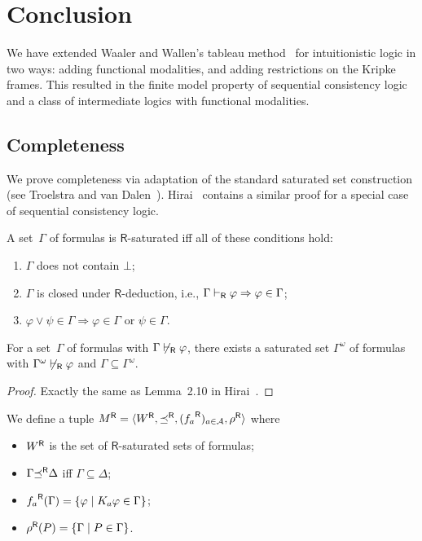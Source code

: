 \section{Conclusion}

We have extended Waaler and Wallen's tableau method~\cite{waaler1999tableaux} for intuitionistic
logic in two ways: adding functional modalities, and adding restrictions on the Kripke frames.
This resulted in the finite model property of sequential consistency
logic~\cite{hirailpar} and a class of intermediate logics with
functional modalities.

\subsection{Completeness}
We prove completeness via
  adaptation of the standard saturated set construction (see Troelstra
  and van Dalen~\cite[Ch.~2]{troelstra1988constructivism}).
  Hirai~\cite{hirailpar} contains a similar proof for a special case of
  sequential consistency logic.

\begin{definition}
 A set~$\Gamma$ of formulas is
 $\mathsf R$-saturated iff all of these conditions hold:
 \begin{enumerate}
  \item $\Gamma$ does not contain $\bot$;
  \item $\Gamma$ is closed under $\mathsf R$-deduction, i.e.,
	$\Gamma\vdash_{\mathsf R}\varphi\Rightarrow\varphi\in\Gamma$;
  \item $\varphi\vee\psi\in\Gamma\Rightarrow\varphi\in\Gamma$ or $\psi\in\Gamma$.
 \end{enumerate}
\end{definition}

\begin{lemma}
 \label{hoe:saturation}
 For a set~$\Gamma$ of formulas with $\Gamma\not\vdash_{\mathsf R}\varphi$,
 there exists a
 saturated set $\Gamma^{\omega}$ of formulas with
 $\Gamma^{\omega}\not\vdash_{\mathsf R}\varphi$ and
 $\Gamma\subseteq \Gamma^{\omega}$.
\end{lemma}
\begin{proof}
 Exactly the same as Lemma~2.10 in Hirai~\cite{hirailpar}.
\end{proof}


\begin{definition}
 We define a tuple
 ${M}^{\mathsf R} = \langle{{W}^{\mathsf R}, {\preceq}^{\mathsf R}, ({f_a}^{\mathsf R})_{a\in \mathcal A}, {\rho}^{\mathsf R}}\rangle$
 where
 \begin{itemize}
  \item ${W}^{\mathsf R}$ is the set of $\mathsf R$-saturated sets of formulas;
  \item $\Gamma{\preceq}^{\mathsf R} \Delta$ iff $\Gamma\subseteq\Delta$;
  \item ${f_a}^{\mathsf R}(\Gamma) = \{\varphi\mid K_a\varphi\in\Gamma\}$;
  \item ${\rho}^{\mathsf R}(P)=\{\Gamma\mid P\in \Gamma\}$.
 \end{itemize}
\end{definition}

